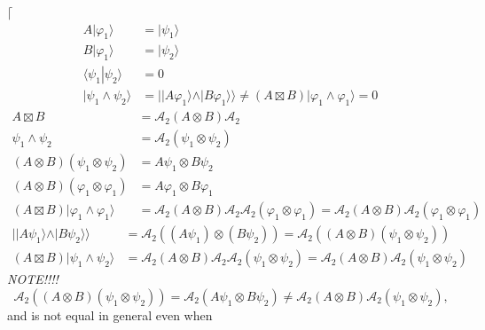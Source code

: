 \documentclass[aps, preprint]{revtex4}
\begin{document}
$\lceil $
\begin{align}A\vert \varphi _{1} \rangle  &  =\vert \psi _{1} \rangle  \\
B\vert \varphi _{1} \rangle  &  =\vert \psi _{2} \rangle  \\
 \langle \left .\psi _{1}\right \vert \psi _{2} \rangle  &  =0 \\
\vert \psi _{1} \wedge \psi _{2} \rangle  &  =\vert \vert A \varphi _{1} \rangle  \wedge \vert B \varphi _{1} \rangle  \rangle  \neq \left (A \boxtimes B\right )\vert \varphi _{1} \wedge \varphi _{1} \rangle  =0\end{align}
\begin{align}A \boxtimes B &  =\mathcal{A}_{2} \left (A \otimes B\right ) \mathcal{A}_{2} \\
\psi _{1} \wedge \psi _{2} &  =\mathcal{A}_{2} \left (\psi _{1} \otimes \psi _{2}\right ) \\
\left (A \otimes B\right ) \left (\psi _{1} \otimes \psi _{2}\right ) &  =A \psi _{1} \otimes B \psi _{2} \\
\left (A \otimes B\right ) \left (\varphi _{1} \otimes \varphi _{1}\right ) &  =A \varphi _{1} \otimes B \varphi _{1} \\
\left (A \boxtimes B\right )\vert \varphi _{1} \wedge \varphi _{1} \rangle  &  =\mathcal{A}_{2} \left (A \otimes B\right ) \mathcal{A}_{2} \mathcal{A}_{2} \left (\varphi _{1} \otimes \varphi _{1}\right ) =\mathcal{A}_{2} \left (A \otimes B\right ) \mathcal{A}_{2} \left (\varphi _{1} \otimes \varphi _{1}\right )\end{align}
\begin{align}\vert \vert A \psi _{1} \rangle  \wedge \vert B \psi _{2} \rangle  \rangle  &  =\mathcal{A}_{2} \left (\left (A \psi _{1}\right ) \otimes \left (B \psi _{2}\right )\right ) =\mathcal{A}_{2} \left (\left (A \otimes B\right ) \left (\psi _{1} \otimes \psi _{2}\right )\right ) \\
\left (A \boxtimes B\right )\vert \psi _{1} \wedge \psi _{2} \rangle  &  =\mathcal{A}_{2} \left (A \otimes B\right ) \mathcal{A}_{2} \mathcal{A}_{2} \left (\psi _{1} \otimes \psi _{2}\right ) =\mathcal{A}_{2} \left (A \otimes B\right ) \mathcal{A}_{2} \left (\psi _{1} \otimes \psi _{2}\right )\end{align}\emph{NOTE!!!!}
\begin{equation}\mathcal{A}_{2} \left (\left (A \otimes B\right ) \left (\psi _{1} \otimes \psi _{2}\right )\right ) =\mathcal{A}_{2} \left (A \psi _{1} \otimes B \psi _{2}\right ) \neq \mathcal{A}_{2} \left (A \otimes B\right ) \mathcal{A}_{2} \left (\psi _{1} \otimes \psi _{2}\right )\text{,}
\end{equation}and is not equal in general even when
\end{document}
